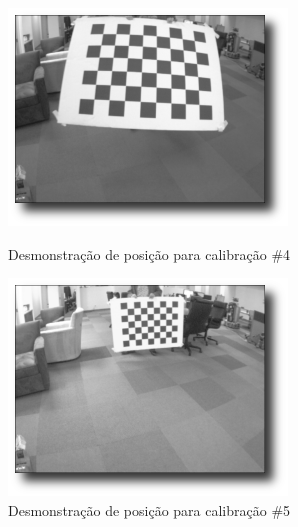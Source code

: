 \begin{figure}[!htb]
  \includegraphics[width=\linewidth]{Imagens/figura3-17.png}
  \caption{Desmonstração de posição para calibração \#4}\label{fig3:17}
\endminipage\hfill
{}
  \includegraphics[width=\linewidth]{Imagens/figura3-18.png}
  \caption{Desmonstração de posição para calibração \#5}\label{fig3:18}
\endminipage\hfill
{}

\end{figure}
